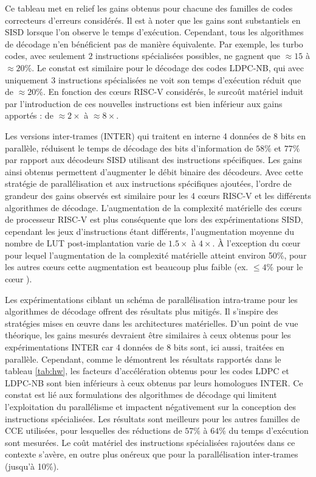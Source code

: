 \documentclass[../main.tex]{subfiles}
\begin{document}

Ce tableau met en relief les gains obtenus pour chacune des familles de codes correcteurs d'erreurs considérés. 
Il est à noter que les gains sont substantiels en SISD lorsque l'on observe le temps d'exécution. 
Cependant, tous les algorithmes de décodage n'en bénéficient pas de manière équivalente. 
Par exemple, les turbo codes, avec seulement $2$ instructions spécialisées possibles, ne gagnent que $\approx 15$ à $\approx 20\%$. 
Le constat est similaire pour le décodage des codes LDPC-NB, qui avec uniquement $3$ instructions spécialisées ne voit son temps d'exécution réduit que de $\approx 20\%$. 
En fonction des cœurs RISC-V considérés, le surcoût matériel induit par l'introduction de ces nouvelles instructions est bien inférieur aux gains apportés : de $\approx2\times$ à $\approx8\times$.

Les versions inter-trames (INTER) qui traitent en interne 4 données de 8 bits en parallèle, réduisent le temps de décodage des bits d'information de $58\%$ et $77\%$ par rapport aux décodeurs SISD utilisant des instructions spécifiques. 
Les gains ainsi obtenus permettent d'augmenter le débit binaire des décodeurs. 
Avec cette stratégie de parallélisation et aux instructions spécifiques ajoutées, l'ordre de grandeur des gains observés est similaire pour les 4 cœurs RISC-V et les différents algorithmes de décodage. 
L'augmentation de la complexité matérielle des cœurs de processeur RISC-V est plus conséquente que lors des expérimentations SISD, cependant les jeux d'instructions étant différents, l'augmentation moyenne du nombre de LUT post-implantation varie de $1.5\times$ à $4\times$. 
À l'exception du cœur \PicoRV\space pour lequel l'augmentation de la complexité matérielle atteint environ 50\%, pour les autres cœurs cette augmentation est beaucoup plus faible (ex. $\leq 4\%$ pour le cœur \RISCY).

Les expérimentations ciblant un schéma de parallélisation intra-trame pour les algorithmes de décodage offrent des résultats plus mitigés. 
Il s'inspire des stratégies mises en œuvre dans les architectures matérielles. 
D'un point de vue théorique, les gains mesurés devraient être similaires à ceux obtenus pour les expérimentations INTER car 4 données de 8 bits sont, ici aussi, traitées en parallèle.
Cependant, comme le démontrent les résultats rapportés dans le tableau \ref{tab:hw}, les facteurs d'accélération obtenus pour les codes LDPC et LDPC-NB sont bien inférieurs à ceux obtenus par leurs homologues INTER. 
Ce constat est lié aux formulations des algorithmes de décodage qui limitent l'exploitation du parallélisme et impactent négativement sur la conception des instructions spécialisées.
Les résultats sont meilleurs pour les autres familles de CCE utilisées, pour lesquelles des réductions de $57\%$ à $64\%$ du temps d'exécution sont mesurées. 
Le coût matériel des instructions spécialisées rajoutées dans ce contexte s'avère, en outre plus onéreux que pour la parallélisation inter-trames (jusqu'à 10\%).
\end{document}
